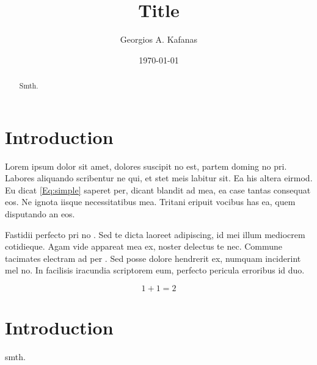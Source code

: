 \documentclass[english, a4paper]{article}
\begin{document}
\graphicspath{{Resources/Images/}{Resources/Diagrams/}}

\onehalfspacing
{}

\title{Title}
\author{Georgios A. Kafanas}
\date{\today}

\maketitle

\begin{abstract}
Smth.
\end{abstract}

\thispagestyle{empty}
\restoregeometry

\clearpage

\tableofcontents
\listoffigures
\listoftables
\listofalgorithms

\clearpage


\section{Introduction}

Lorem ipsum dolor sit amet, dolores suscipit no est, partem doming no pri. Labores aliquando scribentur ne qui, et stet meis labitur sit. Ea his altera eirmod. Eu dicat \cref{Eq:simple} saperet per, dicant blandit ad mea, ea case tantas consequat eos. Ne ignota iisque necessitatibus mea. Tritani eripuit vocibus has ea, quem disputando an eos.

Fastidii perfecto pri no \cite{Davidson2010}. Sed te dicta laoreet adipiscing, id mei illum mediocrem cotidieque. Agam vide appareat mea ex, noster delectus te nec. Commune tacimates electram ad per \cite{Ackermann1998}. Sed posse dolore hendrerit ex, numquam inciderint mel no. In facilisis iracundia scriptorem eum, perfecto pericula erroribus id duo.

\begin{equation} \label{Eq:simple}
	1+1=2
\end{equation}

\printbibliography[title={References}] %
%
%

\appendix
\appendixpage
\addappheadtotoc

\section{Introduction} \label{A:Introduction}

smth.
%

\end{document}
